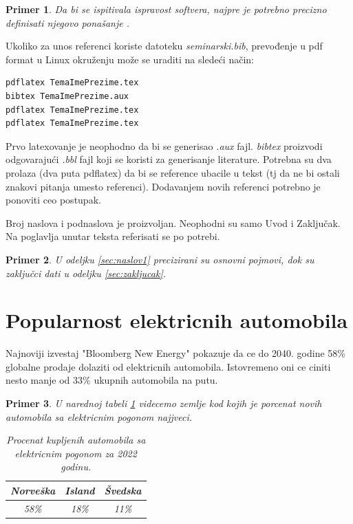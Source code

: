 \documentclass[a4paper]{article}
\newtheorem{primer}{Primer}[section]
\begin{document}
\begin{primer}
 Da bi se ispitivala ispravost softvera, najpre je potrebno precizno definisati njegovo ponašanje \cite{laski2009software}. 
\end{primer}

Ukoliko za unos referenci koriste datoteku {\em seminarski.bib},  prevođenje u pdf format u Linux okruženju može se uraditi na sledeći način:
\begin{verbatim}
pdflatex TemaImePrezime.tex 
bibtex TemaImePrezime.aux 
pdflatex TemaImePrezime.tex 
pdflatex TemaImePrezime.tex 
\end{verbatim}
Prvo latexovanje je neophodno da bi se generisao {\em .aux} fajl. {\em bibtex} proizvodi odgovarajući {\em .bbl} fajl koji se koristi za generisanje literature. 
Potrebna su dva prolaza (dva puta pdflatex) da bi se reference ubacile u tekst (tj da ne bi ostali znakovi pitanja umesto referenci). Dodavanjem novih referenci potrebno je ponoviti ceo postupak.  


Broj naslova i podnaslova je proizvoljan. Neophodni su samo Uvod i Zaključak. Na poglavlja unutar teksta referisati se po potrebi. 
\begin{primer}
U odeljku \ref{sec:naslov1} precizirani su osnovni pojmovi, dok su zaključci dati u odeljku \ref{sec:zakljucak}.
\end{primer}




\section{Popularnost elektricnih automobila}
\label{slike_i_tabele}

Najnoviji izvestaj "Bloomberg New Energy" pokazuje da ce do 2040. godine 58\% globalne prodaje dolaziti od elektricnih automobila. Istovremeno oni ce ciniti nesto manje od 33\% ukupnih automobila na putu.




\begin{primer} U narednoj tabeli \ref{tab:tabela1} videcemo zemlje kod kojih je porcenat novih automobila sa elektricnim pogonom najjveci.


\begin{table}[h!]
\begin{center}
\caption{Procenat kupljenih automobila sa elektricnim pogonom za 2022 godinu.}
\begin{tabular}{|c|c|c|} \hline
Norveška& Island& Švedska\\ \hline
58\% &18\%&11\%\\ \hline
\end{tabular}
\label{tab:tabela1}
\end{center}
\end{table}

\end{primer}
\end{document}
